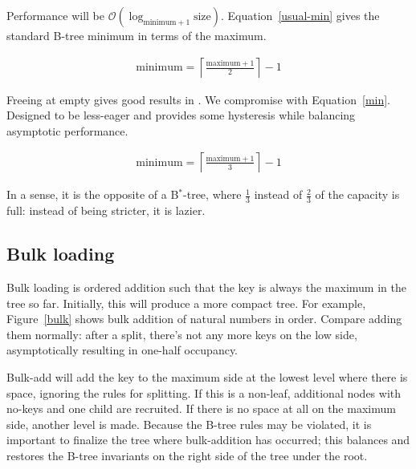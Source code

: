 \documentclass[12pt]{article}
\begin{document}
Performance will be
$\mathcal{O}(\log_{\text{minimum}+1} \text{size})$. Equation~\ref{usual-min} gives the standard B-tree minimum in terms of the maximum.

\begin{align}
\text{minimum} = \left\lceil \frac{\text{maximum}+1}{2} \right\rceil - 1 \label{usual-min}
\end{align}

Freeing at empty gives good results in \cite{johnson1993b}. We compromise with Equation~\ref{min}. Designed to be less-eager and provides some hysteresis while balancing asymptotic performance.

\begin{align}
\text{minimum} = \left\lceil \frac{\text{maximum}+1}{3} \right\rceil - 1 \label{min}
\end{align}

In a sense, it is the opposite of a B$^*$-tree\cite{knuth1997sorting, douglas1979ubiquitous}, where $\frac{1}{3}$ instead of $\frac{2}{3}$ of the capacity is full: instead of being stricter, it is lazier.

\subsection{Bulk loading}

Bulk loading is ordered addition such that the key is always the maximum in the tree so far. Initially, this will produce a more compact tree. For example, Figure~\ref{bulk} shows bulk addition of natural numbers in order. Compare adding them normally: after a split, there's not any more keys on the low side, asymptotically resulting in one-half occupancy.

Bulk-add will add the key to the maximum side at the lowest level where there is space, ignoring the rules for splitting. If this is a non-leaf, additional nodes with no-keys and one child are recruited. If there is no space at all on the maximum side, another level is made. Because the B-tree rules may be violated, it is important to finalize the tree where bulk-addition has occurred; this balances and restores the B-tree invariants on the right side of the tree under the root.
\end{document}
